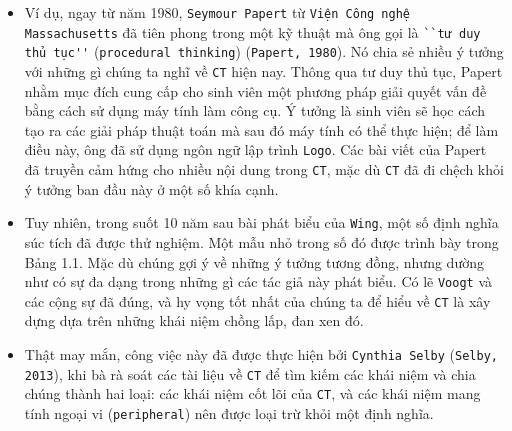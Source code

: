 \begin{itemize}
    \item Ví dụ, ngay từ năm 1980, \texttt{Seymour Papert} từ \texttt{Viện Công nghệ Massachusetts} đã tiên phong trong một kỹ thuật mà ông gọi là \verb|``tư duy thủ tục''| (\verb|procedural thinking|) (\texttt{Papert, 1980}). Nó chia sẻ nhiều ý tưởng với những gì chúng ta nghĩ về \texttt{CT} hiện nay. Thông qua tư duy thủ tục, Papert nhằm mục đích cung cấp cho sinh viên một phương pháp giải quyết vấn đề bằng cách sử dụng máy tính làm công cụ. Ý tưởng là sinh viên sẽ học cách tạo ra các giải pháp thuật toán mà sau đó máy tính có thể thực hiện; để làm điều này, ông đã sử dụng ngôn ngữ lập trình \texttt{Logo}. Các bài viết của Papert đã truyền cảm hứng cho nhiều nội dung trong \texttt{CT}, mặc dù \texttt{CT} đã đi chệch khỏi ý tưởng ban đầu này ở một số khía cạnh.

    \item Tuy nhiên, trong suốt 10 năm sau bài phát biểu của \texttt{Wing}, một số định nghĩa súc tích đã được thử nghiệm. Một mẫu nhỏ trong số đó được trình bày trong Bảng 1.1. Mặc dù chúng gợi ý về những ý tưởng tương đồng, nhưng dường như có sự đa dạng trong những gì các tác giả này phát biểu. Có lẽ \texttt{Voogt} và các cộng sự đã đúng, và hy vọng tốt nhất của chúng ta để hiểu về \texttt{CT} là xây dựng dựa trên những khái niệm chồng lấp, đan xen đó.

    \item Thật may mắn, công việc này đã được thực hiện bởi \texttt{Cynthia Selby} (\texttt{Selby, 2013}), khi bà rà soát các tài liệu về \texttt{CT} để tìm kiếm các khái niệm và chia chúng thành hai loại: các khái niệm cốt lõi của \texttt{CT}, và các khái niệm mang tính ngoại vi (\verb|peripheral|) nên được loại trừ khỏi một định nghĩa.
\end{itemize}

